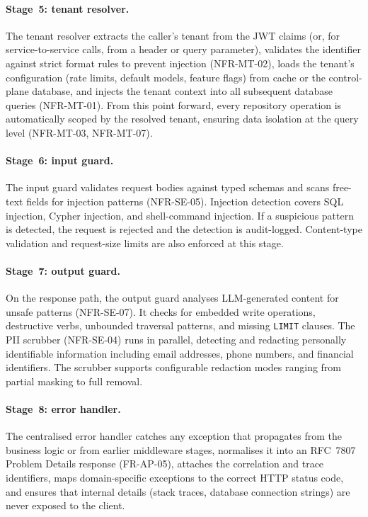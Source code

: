 \documentclass[a4paper]{sapthesis}
\begin{document}
\paragraph{Stage~5: tenant resolver.}
The tenant resolver extracts the caller's tenant from the JWT claims
(or, for service-to-service calls, from a header or query parameter),
validates the identifier against strict format rules to prevent injection
(NFR-MT-02), loads the tenant's configuration (rate limits, default
models, feature flags) from cache or the control-plane database, and
injects the tenant context into all subsequent database queries
(NFR-MT-01).  From this point forward, every repository operation is
automatically scoped by the resolved tenant, ensuring data isolation at
the query level (NFR-MT-03, NFR-MT-07).

\paragraph{Stage~6: input guard.}
The input guard validates request bodies against typed schemas and scans
free-text fields for injection patterns (NFR-SE-05).  Injection detection
covers SQL injection, Cypher injection, and shell-command injection.
If a suspicious pattern is detected, the request is rejected and the
detection is audit-logged.  Content-type validation and request-size limits
are also enforced at this stage.

\paragraph{Stage~7: output guard.}
On the response path, the output guard analyses LLM-generated content for
unsafe patterns (NFR-SE-07).  It checks for embedded write operations,
destructive verbs, unbounded traversal patterns, and missing
\texttt{LIMIT} clauses.  The PII scrubber (NFR-SE-04) runs in parallel,
detecting and redacting personally identifiable information including
email addresses, phone numbers, and financial identifiers.  The scrubber
supports configurable redaction modes ranging from partial masking to
full removal.

\paragraph{Stage~8: error handler.}
The centralised error handler catches any exception that propagates from
the business logic or from earlier middleware stages, normalises it into
an RFC~7807 Problem Details response (FR-AP-05), attaches the
correlation and trace identifiers, maps domain-specific exceptions to
the correct HTTP status code, and ensures that internal details (stack
traces, database connection strings) are never exposed to the client.
\end{document}
